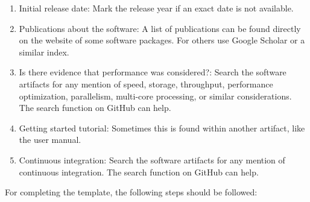 \documentclass[letterpaper,cleveref]{lipics-v2019}
\begin{document}
\begin{enumerate}
\item Initial release date: Mark the release year if an exact date is not
  available.
\item Publications about the software: A list of publications can be found
  directly on the website of some software packages. For others use Google
  Scholar or a similar index.
\item Is there evidence that performance was considered?: Search the software
  artifacts for any mention of speed, storage, throughput, performance
  optimization, parallelism, multi-core processing, or similar
  considerations. The search function on GitHub can help.
\item Getting started tutorial: Sometimes this is found within another artifact,
  like the user manual.
\item Continuous integration: Search the software artifacts for any mention of
  continuous integration. The search function on GitHub can help.
\end{enumerate}

For completing the template, the following steps should be followed:
\end{document}
